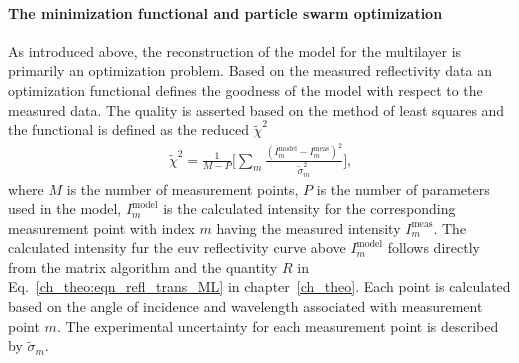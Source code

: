 \paragraph{The minimization functional and particle swarm optimization}
As introduced above, the reconstruction of the model for the multilayer is primarily an optimization problem. Based on the measured reflectivity data an optimization functional defines the goodness of the model with respect to the measured data. The quality is asserted based on the method of least squares \cite{legendre_nouvelles_1805, gauss_theoria_1809, birge_calculation_1932} and the functional is defined as the reduced $\tilde{\chi}^2$
\begin{align}
\tilde{\chi}^2 = \frac{1}{M-P} \bigg[\sum\limits_{m} \frac{(I_m^\text{model} 
- I_m^\text{meas})^2}{\tilde{\sigma}_m^2} \bigg] \text{,} 
\label{ch_spec:eqn_reduced_chi_squared}
\end{align}
where $M$ is the number of measurement points, $P$ is the number of parameters used in the model, $I_m^\text{model}$ is the calculated intensity for the corresponding measurement point with index $m$ having the measured intensity $I_m^\text{meas}$. The calculated intensity fur the \gls{euv} reflectivity curve above $I_m^\text{model}$ follows directly from the matrix algorithm and the quantity $R$ in Eq.~\eqref{ch_theo:eqn_refl_trans_ML} in chapter~\ref{ch_theo}. Each point is calculated based on the angle of incidence and wavelength associated with measurement point $m$. The experimental uncertainty for each measurement point is described by $\tilde{\sigma}_m$.

